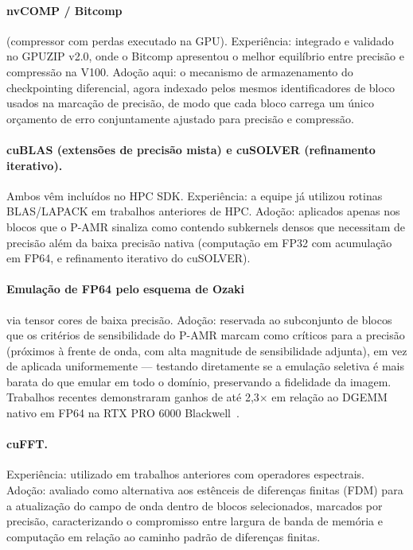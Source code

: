 \documentclass[12pt,a4paper]{article}
\newcommand{\pamr}{P\nobreakdash-AMR}
\begin{document}
\paragraph{nvCOMP / Bitcomp} (compressor com perdas executado na GPU).
Experiência: integrado e validado no GPUZIP v2.0, onde o Bitcomp apresentou o
melhor equilíbrio entre precisão e compressão na V100. Adoção aqui: o
mecanismo de armazenamento do checkpointing diferencial, agora indexado pelos
mesmos identificadores de bloco usados na marcação de precisão, de modo que
cada bloco carrega um único orçamento de erro conjuntamente ajustado para
precisão e compressão.

\paragraph{cuBLAS (extensões de precisão mista) e cuSOLVER (refinamento
iterativo).} Ambos vêm incluídos no HPC SDK. Experiência: a equipe já utilizou
rotinas BLAS/LAPACK em trabalhos anteriores de HPC. Adoção: aplicados apenas
nos blocos que o \pamr{} sinaliza como contendo subkernels densos que
necessitam de precisão além da baixa precisão nativa (computação em FP32 com
acumulação em FP64, e refinamento iterativo do cuSOLVER).

\paragraph{Emulação de FP64 pelo esquema de Ozaki} via tensor cores de baixa
precisão. Adoção: reservada ao subconjunto de blocos que os critérios de
sensibilidade do \pamr{} marcam como críticos para a precisão (próximos à
frente de onda, com alta magnitude de sensibilidade adjunta), em vez de
aplicada uniformemente --- testando diretamente se a emulação seletiva é mais
barata do que emular em todo o domínio, preservando a fidelidade da imagem.
Trabalhos recentes demonstraram ganhos de até 2,3$\times$ em relação ao DGEMM
nativo em FP64 na RTX PRO 6000 Blackwell~\cite{uchino2025ozaki}.

\paragraph{cuFFT.} Experiência: utilizado em trabalhos anteriores com
operadores espectrais. Adoção: avaliado como alternativa aos estênceis de
diferenças finitas (FDM) para a atualização do campo de onda dentro de blocos
selecionados, marcados por precisão, caracterizando o compromisso entre
largura de banda de memória e computação em relação ao caminho padrão de
diferenças finitas.
\end{document}
